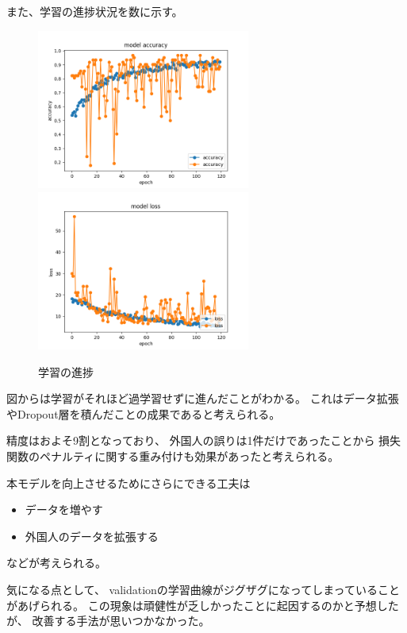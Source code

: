\documentclass[uplatex]{jsarticle}
\begin{document}
また、学習の進捗状況を数に示す。

\begin{figure}[H]
  \begin{center}
    \includegraphics[width=7cm]{../data/history/acc.png}
    \includegraphics[width=7cm]{../data/history/loss.png}
    \caption{学習の進捗}
  \end{center}
\end{figure}

図からは学習がそれほど過学習せずに進んだことがわかる。
これはデータ拡張やDropout層を積んだことの成果であると考えられる。

精度はおよそ9割となっており、
外国人の誤りは1件だけであったことから
損失関数のペナルティに関する重み付けも効果があったと考えられる。

本モデルを向上させるためにさらにできる工夫は
\begin{itemize}
  \item データを増やす
  \item 外国人のデータを拡張する
\end{itemize}

などが考えられる。

気になる点として、
validationの学習曲線がジグザグになってしまっていることがあげられる。
この現象は頑健性が乏しかったことに起因するのかと予想したが、
改善する手法が思いつかなかった。
\end{document}
